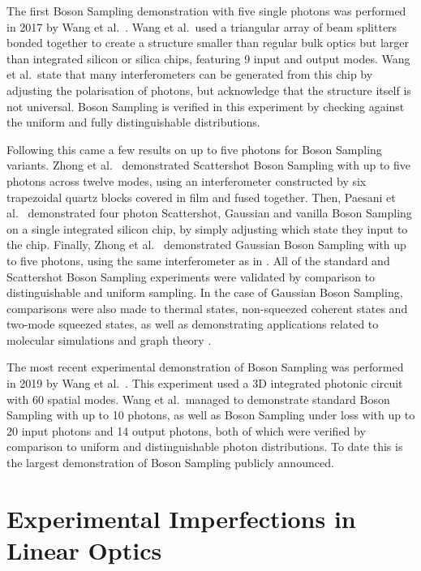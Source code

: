 The first Boson Sampling demonstration with five single photons was performed in 2017 by Wang et al.~\cite{wang2017}. Wang et al.\ used a triangular array of beam splitters bonded together to create a structure smaller than regular bulk optics but larger than integrated silicon or silica chips, featuring 9 input and output modes. Wang et al.\ state that many interferometers can be generated from this chip by adjusting the polarisation of photons, but acknowledge that the structure itself is not universal. Boson Sampling is verified in this experiment by checking against the uniform and fully distinguishable distributions.

Following this came a few results on up to five photons for Boson Sampling variants. Zhong et al.~\cite{zhong2018} demonstrated Scattershot Boson Sampling with up to five photons across twelve modes, using an interferometer constructed by six trapezoidal quartz blocks covered in film and fused together. Then, Paesani et al.~\cite{paesani2018} demonstrated four photon Scattershot, Gaussian and vanilla Boson Sampling on a single integrated silicon chip, by simply adjusting which state they input to the chip. Finally, Zhong et al.~\cite{zhong2019} demonstrated Gaussian Boson Sampling with up to five photons, using the same interferometer as in \cite{zhong2018}. All of the standard and Scattershot Boson Sampling experiments were validated by comparison to distinguishable and uniform sampling. In the case of Gaussian Boson Sampling, comparisons were also made to thermal states, non-squeezed coherent states and two-mode squeezed states, as well as demonstrating applications related to molecular simulations and graph theory \cite{paesani2018, zhong2019}.

The most recent experimental demonstration of Boson Sampling was performed in 2019 by Wang et al.~\cite{wang2019}. This experiment used a 3D integrated photonic circuit with 60 spatial modes. Wang et al.\ managed to demonstrate standard Boson Sampling with up to 10 photons, as well as Boson Sampling under loss with up to 20 input photons and 14 output photons, both of which were verified by comparison to uniform and distinguishable photon distributions. To date this is the largest demonstration of Boson Sampling publicly announced.

\section{Experimental Imperfections in Linear Optics}

